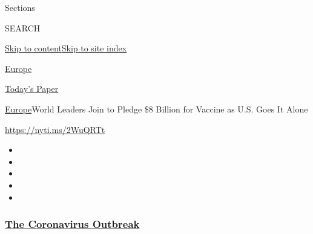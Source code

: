 Sections

SEARCH

\protect\hyperlink{site-content}{Skip to
content}\protect\hyperlink{site-index}{Skip to site index}

\href{https://www.nytimes3xbfgragh.onion/section/world/europe}{Europe}

\href{https://myaccount.nytimes3xbfgragh.onion/auth/login?response_type=cookie\&client_id=vi}{}

\href{https://www.nytimes3xbfgragh.onion/section/todayspaper}{Today's
Paper}

\href{/section/world/europe}{Europe}\textbar{}World Leaders Join to
Pledge \$8 Billion for Vaccine as U.S. Goes It Alone

\url{https://nyti.ms/2WuQRTt}

\begin{itemize}
\item
\item
\item
\item
\item
\end{itemize}

\hypertarget{the-coronavirus-outbreak}{%
\subsubsection{\texorpdfstring{\href{https://www.nytimes3xbfgragh.onion/news-event/coronavirus?name=styln-coronavirus-national\&region=TOP_BANNER\&block=storyline_menu_recirc\&action=click\&pgtype=Article\&impression_id=33999180-f4bd-11ea-bc0c-2dd0f27298e1\&variant=undefined}{The
Coronavirus
Outbreak}}{The Coronavirus Outbreak}}\label{the-coronavirus-outbreak}}


